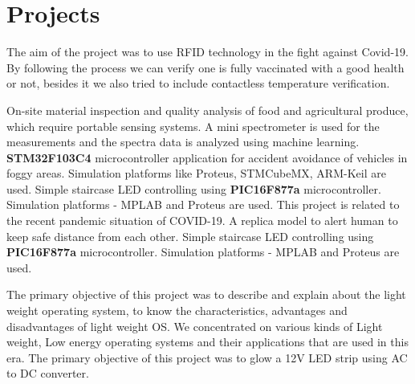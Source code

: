 \documentclass[11pt,a4paper,sans]{moderncv}        %
\begin{document}


\section{Projects}
{The aim of the project was to use RFID technology in the fight against Covid-19. By following the process we can verify one is fully vaccinated with a good health or not, besides it we also tried to include contactless temperature verification.
}

{On-site material inspection and quality analysis of food and agricultural produce, which require portable sensing systems. A mini spectrometer is used for the measurements and the spectra data is analyzed using machine learning.
}
{\textbf{STM32F103C4} microcontroller application for accident avoidance of vehicles in foggy areas. Simulation platforms like Proteus, STMCubeMX, ARM-Keil are used.
}
{Simple staircase LED controlling using \textbf{PIC16F877a} microcontroller. Simulation platforms - MPLAB and  Proteus are used.
}
{This project is related to the recent pandemic situation of COVID-19. A replica model to alert human to keep safe distance from each other. 
}
{Simple staircase LED controlling using \textbf{PIC16F877a} microcontroller. Simulation platforms - MPLAB and  Proteus are used.
}

{The primary objective of this project was to  describe  and  explain about the light weight operating system, to know the characteristics, advantages and disadvantages of light weight OS. We concentrated on various kinds of Light weight, Low energy operating  systems and  their  applications  that  are used in this era. 
}
{The primary objective of this project was to glow a 12V LED strip using AC to DC converter.
}
\end{document}
